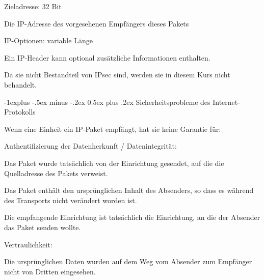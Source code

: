 \documentclass[a4paper]{article}
\makeatletter
\renewcommand{\subsection}{\@startsection{subsection}{2}{0mm}%
 {-1explus -.5ex minus -.2ex}%
 {0.5ex plus .2ex}%
 {\normalfont\normalsize\bfseries}}
\makeatother
\begin{document}
\begin{multicols}{3}
\begin{itemize*}
\begin{itemize*}
            \end{itemize*}
            \item Zieladresse: 32 Bit
            \begin{itemize*}
                  \item Die IP-Adresse des vorgesehenen Empfängers dieses Pakets
            \end{itemize*}
            \item IP-Optionen: variable Länge
            \begin{itemize*}
                  \item Ein IP-Header kann optional zusätzliche Informationen enthalten.
                  \item Da sie nicht Bestandteil von IPsec sind, werden sie in diesem Kurs nicht behandelt.
            \end{itemize*}
      \end{itemize*}


      \subsection{Sicherheitsprobleme des
            Internet-Protokolls}

      \begin{itemize*}
            \item Wenn eine Einheit ein IP-Paket empfängt, hat sie keine Garantie für:
            \begin{itemize*}
                  \item Authentifizierung der Datenherkunft / Datenintegrität:
                  \begin{itemize*} \item Das Paket wurde tatsächlich von der Einrichtung gesendet, auf die die Quelladresse des Pakets verweist. \item Das Paket enthält den ursprünglichen Inhalt des Absenders, so dass es während des Transports nicht verändert worden ist. \item Die empfangende Einrichtung ist tatsächlich die Einrichtung, an die der Absender das Paket senden wollte. \end{itemize*}
                  \item Vertraulichkeit:
                  \begin{itemize*} \item Die ursprünglichen Daten wurden auf dem Weg vom Absender zum Empfänger nicht von Dritten eingesehen. \end{itemize*}
            \end{itemize*}
      \end{itemize*}



\end{multicols}
\end{document}
